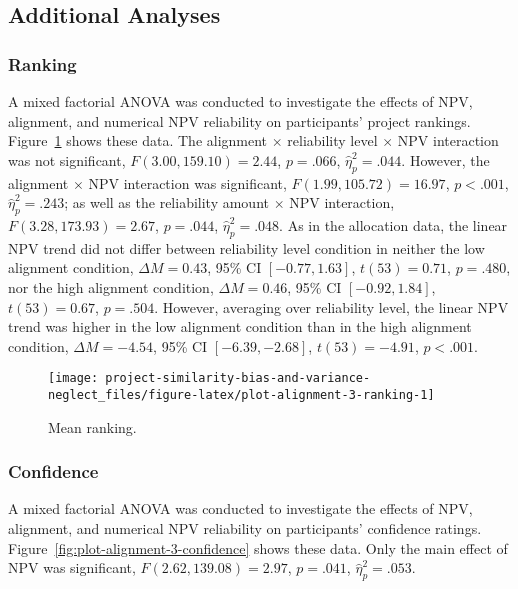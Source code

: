 \documentclass[
  english,
  man, donotrepeattitle,floatsintext]{apa7}
\theoremstyle{definition}
\theoremstyle{definition}
\theoremstyle{definition}
\theoremstyle{definition}
\theoremstyle{remark}
\begin{document}
\hypertarget{results-alignment-3-appendix}{%
\subsection{Additional Analyses}\label{results-alignment-3-appendix}}

\hypertarget{ranking-1}{%
\subsubsection{Ranking}\label{ranking-1}}

A mixed factorial ANOVA was conducted to investigate the effects of NPV,
alignment, and numerical NPV reliability on participants' project rankings.
Figure~\ref{fig:plot-alignment-3-ranking} shows these data. The alignment
\(\times\) reliability level \(\times\) NPV interaction was not
significant,
\(F(3.00, 159.10) = 2.44\), \(p = .066\), \(\hat{\eta}^2_p = .044\).
However, the alignment \(\times\) NPV interaction was significant,
\(F(1.99, 105.72) = 16.97\), \(p < .001\), \(\hat{\eta}^2_p = .243\); as well as the reliability
amount \(\times\) NPV interaction,
\(F(3.28, 173.93) = 2.67\), \(p = .044\), \(\hat{\eta}^2_p = .048\). As in the
allocation data, the linear NPV trend did not differ between reliability level
condition in neither the low alignment condition,
\(\Delta M = 0.43\), 95\% CI \([-0.77, 1.63]\), \(t(53) = 0.71\), \(p = .480\), nor the high alignment
condition, \(\Delta M = 0.46\), 95\% CI \([-0.92, 1.84]\), \(t(53) = 0.67\), \(p = .504\). However,
averaging over reliability level, the linear NPV trend was higher in the low
alignment condition than in the high alignment condition,
\(\Delta M = -4.54\), 95\% CI \([-6.39, -2.68]\), \(t(53) = -4.91\), \(p < .001\).



\begin{figure}
\texttt{[image: project-similarity-bias-and-variance-neglect\_files/figure-latex/plot-alignment-3-ranking-1]} \caption{Mean ranking.}\label{fig:plot-alignment-3-ranking}
\end{figure}

\hypertarget{confidence-1}{%
\subsubsection{Confidence}\label{confidence-1}}

A mixed factorial ANOVA was conducted to investigate the effects of NPV,
alignment, and numerical NPV reliability on participants' confidence ratings.
Figure~\ref{fig:plot-alignment-3-confidence} shows these data. Only the main
effect of NPV was significant,
\(F(2.62, 139.08) = 2.97\), \(p = .041\), \(\hat{\eta}^2_p = .053\).
\end{document}
